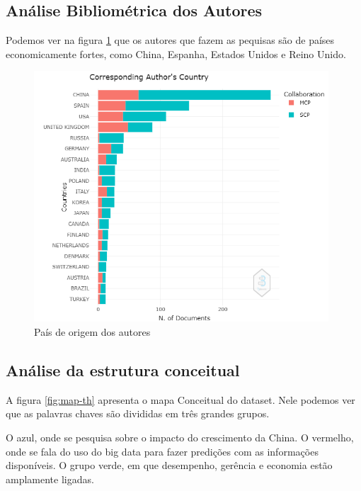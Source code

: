 \subsection{Análise Bibliométrica dos Autores}

Podemos ver na  figura \ref{fig:map-autor} que os autores que fazem as pequisas são de países economicamente fortes, como China, Espanha, Estados Unidos e Reino Unido.

\begin{figure}[ht]
    \centering
    \includegraphics[width=11cm]{experiments/Tong00020/PesquisaBibliometrica/Authors/MASSA@Tong00020-Corresponding Author's Country.png}
    \caption{País de origem dos autores}
    \label{fig:map-autor}
\end{figure}

\subsection{Análise da estrutura conceitual}

A figura \ref{fig:map-th} apresenta o mapa Conceitual do dataset. Nele podemos ver que as palavras chaves são divididas em três grandes grupos. 

O azul, onde se pesquisa sobre o impacto do crescimento da China. O vermelho, onde se fala do uso do big data para fazer predições com as informações disponíveis. O grupo verde, em que desempenho, gerência e economia estão amplamente ligadas.

